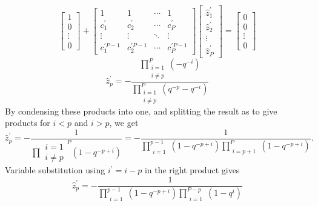 \documentclass[
journal=jctcce,
manuscript=letter]{achemso}
\begin{document}
\begin{dmath}
\label{eq:finalMatrix_self}
\begin{bmatrix}
       1    \\[0.3em]
       0  \\[0.3em]
       \vdots          \\[0.3em]
       0      
     \end{bmatrix} + \begin{bmatrix}  
  1 & 1 & \cdots & 1 \\
  c^{\prime}_1 & c^{\prime}_2 & \cdots & c^{\prime}_P \\
  \vdots  & \vdots  & \ddots & \vdots  \\
  c^{\prime P-1}_1 & c^{\prime P-1}_2 & \cdots & c^{\prime P-1}_P
     \end{bmatrix}
     \begin{bmatrix}
       \hat{z}^{\prime}_{1}    \\[0.3em]
       \hat{z}^{\prime}_{2}  \\[0.3em]
       \vdots          \\[0.3em]
       \hat{z}^{\prime}_{P} 
     \end{bmatrix}
     = \begin{bmatrix}
       0    \\[0.3em]
       0  \\[0.3em]
       \vdots          \\[0.3em]
       0      
     \end{bmatrix}
\end{dmath}
\begin{equation}
\label{eq:moment_derivation_0_self}
\hat{z}^{\prime}_p = -\frac{\prod_{\substack{i = 1 \\ i \ne p }}^{P} (-q^{-i})}{\prod_{\substack{i = 1 \\ i \ne p }}^{P} (q^{-p} - q^{-i})  }
\end{equation}
By condensing these products into one, and splitting the result as to give products for $i<p$ and $i>p$, we get
\begin{equation}
\label{eq:moment_derivation_0_self2}
\hat{z}^{\prime}_p = -\frac{1}{\prod{\substack{i = 1 \\ i \ne p }}^{P}(1-q^{-p+i})} = -\frac{1}{\prod_{\substack{i = 1}}^{p-1}(1-q^{-p+i})\prod_{\substack{i = p+1 }}^{P}(1-q^{-p+i})}.
\end{equation}
Variable substitution using $i^{\prime}=i-p$ in the right product gives
\begin{equation}
\label{eq:moment_derivation_0_self3}
\hat{z}^{\prime}_p = -\frac{1}{\prod_{\substack{i = 1}}^{p-1}(1-q^{-p+i})\prod_{\substack{i = 1 }}^{P-p}(1-q^{i})}
\end{equation}
\end{document}
